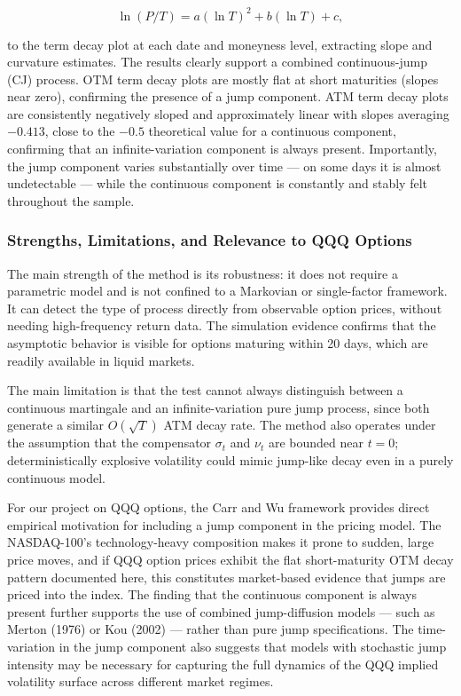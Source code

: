 \documentclass[12pt]{article}
\begin{document}
\begin{equation}
    \ln(P/T) = a(\ln T)^2 + b(\ln T) + c,
\end{equation}

to the term decay plot at each date and moneyness level, extracting slope
and curvature estimates. The results clearly support a combined
continuous-jump (CJ) process. OTM term decay plots are mostly flat at
short maturities (slopes near zero), confirming the presence of a jump
component. ATM term decay plots are consistently negatively sloped and
approximately linear with slopes averaging $-0.413$, close to the
$-0.5$ theoretical value for a continuous component, confirming that
an infinite-variation component is always present. Importantly, the jump
component varies substantially over time --- on some days it is almost
undetectable --- while the continuous component is constantly and
stably felt throughout the sample.

\subsubsection*{Strengths, Limitations, and Relevance to QQQ Options}

The main strength of the method is its robustness: it does not require a
parametric model and is not confined to a Markovian or single-factor
framework. It can detect the type of process directly from observable option
prices, without needing high-frequency return data. The simulation evidence
confirms that the asymptotic behavior is visible for options maturing within
20 days, which are readily available in liquid markets.

The main limitation is that the test cannot always distinguish between a
continuous martingale and an infinite-variation pure jump process, since
both generate a similar $O(\sqrt{T})$ ATM decay rate. The method also
operates under the assumption that the compensator $\sigma_t$ and $\nu_t$
are bounded near $t=0$; deterministically explosive volatility could
mimic jump-like decay even in a purely continuous model.

For our project on QQQ options, the Carr and Wu framework provides
direct empirical motivation for including a jump component in the pricing
model. The NASDAQ-100's technology-heavy composition makes it prone
to sudden, large price moves, and if QQQ option prices exhibit the flat
short-maturity OTM decay pattern documented here, this constitutes
market-based evidence that jumps are priced into the index. The finding
that the continuous component is always present further supports the use
of combined jump-diffusion models --- such as Merton (1976) or Kou (2002)
--- rather than pure jump specifications. The time-variation in the jump
component also suggests that models with stochastic jump intensity may
be necessary for capturing the full dynamics of the QQQ implied volatility
surface across different market regimes.
\end{document}
